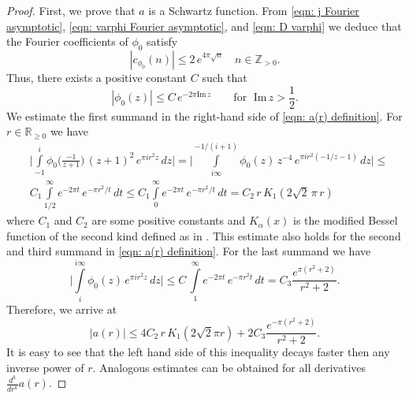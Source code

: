 \documentclass{scrartcl}
\renewcommand{\Im}{\mathrm{Im}\,}
\newcommand{\R}{\mathbb{R}}
\newcommand{\Z}{\mathbb{Z}}
\begin{document}
\begin{proof}
First, we prove that $a$ is a Schwartz function. From \eqref{eqn: j Fourier asymptotic}, \eqref{eqn: varphi Fourier asymptotic}, and \eqref{eqn: D varphi} we deduce that the Fourier coefficients of $\phi_0$ satisfy
$$|c_{\phi_0}(n)|\leq2\,e^{4\pi\sqrt{n}}\quad n\in\Z_{>0}.$$ Thus, there exists a positive constant $C$ such that
$$|\phi_0(z)|\leq C\,e^{-2\pi \Im{z}}\qquad \mbox{for } \; \Im{z}>\frac 12.$$ We estimate the first summand in the right-hand side of \eqref{eqn: a(r) definition}.  For $r\in\R_{\geq 0}$ we have
\begin{align*}&\Bigg|\int\limits_{-1}^{i}\phi_0\Big(\frac{-1}{z+1}\Big)\,(z+1)^2\,e^{\pi i r^2 z}\,dz\Bigg|=\Bigg|\int\limits_{i\infty}^{-1/(i+1)}\phi_0(z)\,z^{-4}\,e^{\pi i r^2 (-1/z-1)}\,dz\Bigg|\leq \\
 &C_1\int\limits_{1/2}^{\infty}e^{-2\pi t}\,e^{-\pi  r^2/t}\,dt\leq C_1\int\limits_{0}^{\infty}e^{-2\pi t}\,e^{-\pi  r^2/t}\,dt=C_2\,r\,K_1(2\sqrt{2}\,\pi\,r)
\end{align*}
where $C_1$ and $C_2$ are some positive constants and $K_\alpha(x)$ is the modified Bessel function of the second kind defined as in \cite[Section~9.6]{Abramowitz}. This estimate also holds for the second and third summand in \eqref{eqn: a(r) definition}.
For the last summand we have
$$ \Bigg|\int\limits_{i}^{i\infty}\phi_0(z)\,e^{\pi i r^2 z}\,dz\Bigg|\leq C\,\int\limits_{1}^{\infty} e^{-2\pi t}\,e^{-\pi r^2 t}\,dt=C_3\frac{e^{\pi(r^2+2)}}{r^2+2}.$$
Therefore, we arrive at
$$|a(r)|\leq 4C_2\,r\,K_1(2\sqrt{2}\pi r)+2C_3\frac{e^{-\pi(r^2+2)}}{r^2+2}.$$
It is easy to see that the left hand side of this inequality decays faster then any inverse power of $r$. Analogous estimates can be obtained for all derivatives $\frac{d^k}{dr^k}a(r)$.


\end{proof}
\end{document}
